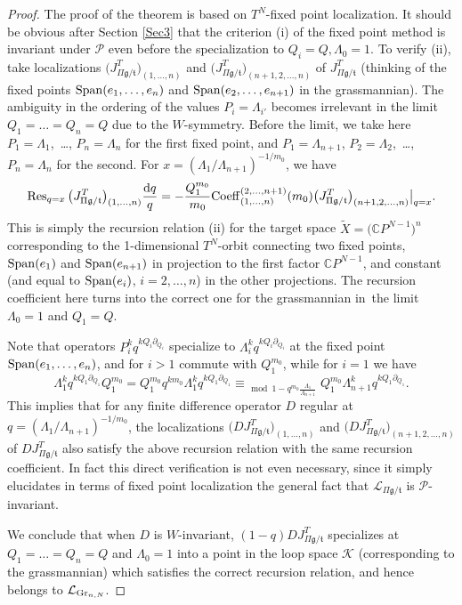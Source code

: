 \documentclass[10pt,a4paper]{amsart}
\numberwithin{equation}{section}
\def\K{\mathcal K}
\def\L{\mathcal L}
\def\CC{\mathbb C}
\def\Res{\operatorname{Res}}
\def\tilde{\widetilde}
\def\p{\partial}
\theoremstyle{definition}
\theoremstyle{plain}
\begin{document}
\begin{proof}
The proof of the theorem is based on $T^N$-fixed point localization. It should be obvious after Section \ref{Sec3} that the criterion (i) of the fixed point method is invariant under ${\mathcal P}$ even before the specialization to $Q_i=Q, \Lambda_0=1$. To verify (ii), take localizations $\big(J^T_{\Pi \mathfrak{g}/\mathfrak{t}}\big)_{(1,\dots,n)}$ and $\big(J^T_{\Pi \mathfrak{g}/\mathfrak{t}}\big)_{(n+1, 2,\dots,n)}$ of $J^T_{\Pi \mathfrak{g}/\mathfrak{t}}$ (thinking of the fixed points $\mathop{\rm Span}(e_1,\dots,e_n)$ and $\mathop{\rm Span}(e_2,\dots,e_{n+1})$ in the grassmannian). The ambiguity in the ordering of the values $P_i=\Lambda_{i'}$ becomes irrelevant in the limit $Q_1=\dots=Q_n=Q$ due to the $W$-symmetry. Before the limit, we take here $P_1=\Lambda_1$,~\dots, $P_n=\Lambda_n$ for the first fixed point, and $P_1=\Lambda_{n+1}$, $P_2=\Lambda_2$,~\dots, $P_n=\Lambda_n$ for the second. For $x=(\Lambda_1/\Lambda_{n+1})^{-1/m_0}$, we have
\[
\Res_{q=x} \big(J^T_{\Pi \mathfrak{g}/\mathfrak{t}}\big)_{(1,\dots,n)}\frac{{\rm d}q}{q} = -\frac{Q_1^{m_0}}{m_0} {\rm Coeff}_{(1,\dots,n)}^{(2,\dots,n+1)}(m_0)\big(J^T_{\Pi \mathfrak{g}/\mathfrak{t}}\big)_{(n+1, 2,\dots,n)}\big|_{q=x}.
\]
This is simply the recursion relation (ii) for the target space $\tilde{X}=\big(\CC P^{N-1}\big)^n$ corresponding to the 1-dimensional $T^N$-orbit connecting two fixed points, $\mathop{\rm Span}(e_1)$ and $\mathop{\rm Span}(e_{n+1})$ in projection to the first factor $\CC P^{N-1}$, and constant (and equal to $\mathop{\rm Span}(e_i)$, $i=2,\dots,n$) in the other projections. The recursion coefficient here turns into the correct one for the grassmannian in~the limit $\Lambda_0=1$ and $Q_1=Q$.

Note that operators $P_i^kq^{kQ_i\p_{Q_i}}$ specialize to $\Lambda_i^k q^{kQ_i\p_{Q_i}}$ at the fixed point $\mathop{\rm Span}(e_1,\dots,e_n)$, and for $i>1$ commute with $Q_1^{m_0}$, while for $i=1$ we have
\[
\Lambda_1^k q^{kQ_1\p_{Q_1}} Q_1^{m_0}=Q_1^{m_0}q^{km_0} \Lambda_1^k q^{kQ_1\p_{Q_1}} \equiv_{\mod 1-q^{m_0}\frac{\Lambda_1}{\Lambda_{n+1}}}
Q_1^{m_0}\Lambda_{n+1}^{k} q^{kQ_1\p_{Q_1}}.
\]
This implies that for any finite difference operator $D$ regular at $q=(\Lambda_1/\Lambda_{n+1})^{-1/m_0}$, the localizations $\big(D J^T_{\Pi \mathfrak{g}/\mathfrak{t}}\big)_{(1,\dots,n)}$ and $\big(D J^T_{\Pi \mathfrak{g}/\mathfrak{t}}\big)_{(n+1,2,\dots,n)}$ of $D J^T_{\Pi \mathfrak{g}/\mathfrak{t}}$ also satisfy the above recursion relation with the same recursion coefficient. In fact this direct verification is not even necessary, since it simply elucidates in terms of fixed point localization the general fact that $\L_{\Pi \mathfrak{g}/\mathfrak{t}}$ is ${\mathcal P}$-invariant.

We conclude that when $D$ is $W$-invariant, $(1-q) D J^T_{\Pi \mathfrak{g}/\mathfrak{t}}$ specializes at $Q_1=\dots=Q_n=Q$ and $\Lambda_0=1$ into a point in the loop space $\K$ (corresponding to the grassmannian) which satisfies the correct recursion relation, and hence belongs to $\L_{{\rm Gr}_{n,N}}$.
\end{proof}
\end{document}
